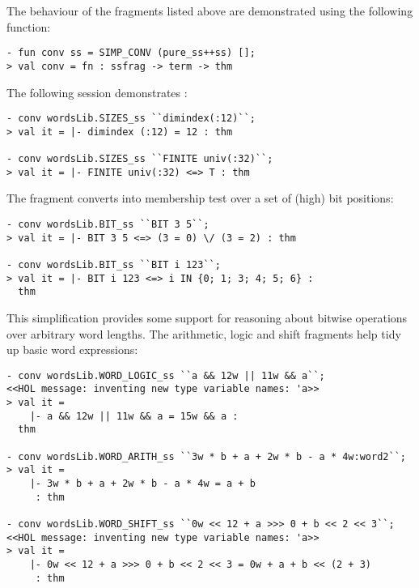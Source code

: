 The behaviour of the fragments listed above are demonstrated using the following function:
\begin{session}
\begin{verbatim}
- fun conv ss = SIMP_CONV (pure_ss++ss) [];
> val conv = fn : ssfrag -> term -> thm
\end{verbatim}
\end{session}
The following session demonstrates :
\begin{session}
\begin{verbatim}
- conv wordsLib.SIZES_ss ``dimindex(:12)``;
> val it = |- dimindex (:12) = 12 : thm

- conv wordsLib.SIZES_ss ``FINITE univ(:32)``;
> val it = |- FINITE univ(:32) <=> T : thm
\end{verbatim}
\end{session}
The fragment  converts  into membership test over a set of (high) bit positions:
\begin{session}
\begin{verbatim}
- conv wordsLib.BIT_ss ``BIT 3 5``;
> val it = |- BIT 3 5 <=> (3 = 0) \/ (3 = 2) : thm

- conv wordsLib.BIT_ss ``BIT i 123``;
> val it = |- BIT i 123 <=> i IN {0; 1; 3; 4; 5; 6} :
  thm
\end{verbatim}
\end{session}
This simplification provides some support for reasoning about bitwise operations over arbitrary word lengths.  The arithmetic, logic and shift fragments help tidy up basic word expressions:
\begin{session}
\begin{verbatim}
- conv wordsLib.WORD_LOGIC_ss ``a && 12w || 11w && a``;
<<HOL message: inventing new type variable names: 'a>>
> val it =
    |- a && 12w || 11w && a = 15w && a :
  thm

- conv wordsLib.WORD_ARITH_ss ``3w * b + a + 2w * b - a * 4w:word2``;
> val it =
    |- 3w * b + a + 2w * b - a * 4w = a + b
     : thm

- conv wordsLib.WORD_SHIFT_ss ``0w << 12 + a >>> 0 + b << 2 << 3``;
<<HOL message: inventing new type variable names: 'a>>
> val it =
    |- 0w << 12 + a >>> 0 + b << 2 << 3 = 0w + a + b << (2 + 3)
     : thm
\end{verbatim}
\end{session}


